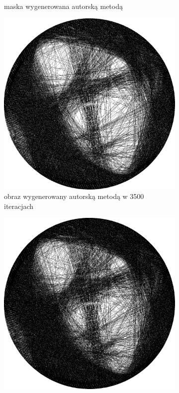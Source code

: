 \begin{figure}[H]
\begin{subfigure}{0.23\textwidth}
            \caption{maska wygenerowana autorską metodą\\\hphantom{ }}
            \label{comp-comp-magdalene-d}
        \end{subfigure}
        \begin{subfigure}{0.23\textwidth}
            \centering
            \includegraphics[width = \textwidth]{img/6-comp/magdalene_e_i3500_c20_inv0_bg1_obj10_ed1.png}
            \caption{obraz wygenerowany autorską metodą w 3500 iteracjach}
            \label{comp-comp-magdalene-e}
        \end{subfigure}
        \begin{subfigure}{0.23\textwidth}
            \centering
            \includegraphics[width = \textwidth]{img/6-comp/magdalene_e_i4000_c20_inv0_bg1_obj10_ed1.png}

\end{subfigure}
\end{figure}
